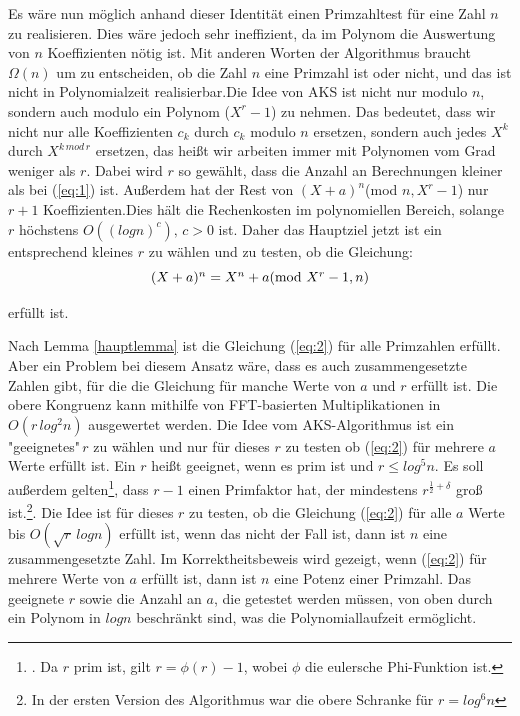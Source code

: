 \documentclass[12pt,oneside]{article}
\theoremstyle{remark}
\theoremstyle{definition}
\begin{document}
\begin{flushleft}
Es wäre nun möglich anhand dieser Identität einen Primzahltest für eine Zahl $n$ zu realisieren. Dies wäre jedoch sehr ineffizient, da im Polynom die Auswertung von $n$ Koeffizienten nötig ist. Mit anderen Worten der Algorithmus braucht $\Omega(n)$ um zu entscheiden, ob die Zahl $n$ eine Primzahl ist oder nicht, und das ist nicht in Polynomialzeit realisierbar.\newline\newline Die Idee von AKS ist nicht nur modulo $n$, sondern auch modulo ein Polynom ($X^r -1$) zu nehmen. Das bedeutet, dass wir nicht nur alle Koeffizienten $c_{k}$ durch $c_{k}$ modulo $n$ ersetzen, sondern auch jedes $X^k$ durch $X^{k \, mod \, r}$ ersetzen, das heißt wir arbeiten immer mit Polynomen vom Grad weniger als $r$. Dabei wird $r$ so gewählt, dass die Anzahl an Berechnungen kleiner als bei (\ref{eq:1}) ist. Außerdem hat der Rest von $(X + a)^n$(mod $ n, X^r - 1$) nur $ r + 1$ Koeffizienten.\newline Dies hält die Rechenkosten im polynomiellen Bereich, solange $r$ höchstens $O ((log n)^c), \, c > 0$ ist. Daher das Hauptziel jetzt ist ein entsprechend kleines $r$ zu wählen und zu testen, ob die Gleichung:\newline\newline
\begin{equation}\label{eq:2}
    \centerline{$(X + a)^n = X^n + a $(mod $X^r - 1, n$)}
\end{equation}

erfüllt ist.\newline

Nach Lemma \ref{hauptlemma} ist die Gleichung (\ref{eq:2}) für alle Primzahlen erfüllt. Aber ein Problem bei diesem Ansatz wäre, dass es auch zusammengesetzte Zahlen gibt, für die die Gleichung für manche Werte von $a$ und $r$ erfüllt ist. Die obere Kongruenz kann mithilfe von FFT-basierten Multiplikationen in $O(r \, log^2 n)$ ausgewertet werden\cite{D73}. Die Idee vom AKS-Algorithmus ist ein "geeignetes"$\, r$ zu wählen und nur für dieses $r$ zu testen ob (\ref{eq:2}) für mehrere $a$ Werte erfüllt ist. Ein $r$ heißt geeignet, wenn es prim ist und $r \leq log^5 n$. Es soll außerdem gelten\footnote{. Da $r$ prim ist, gilt $r = \phi(r) - 1 $, wobei $\phi$ die eulersche Phi-Funktion ist.}, dass $r - 1$ einen Primfaktor hat, der mindestens $r^{\frac{1}{2} + \delta}$ groß ist.\footnote{In der ersten Version des Algorithmus war die obere Schranke für $r = log^6 n$}. Die Idee ist für dieses $r$ zu testen, ob die Gleichung (\ref{eq:2}) für alle $a$ Werte bis $O(\sqrt{r}\, logn)$ erfüllt ist, wenn das nicht der Fall ist, dann ist $n$ eine zusammengesetzte Zahl. Im Korrektheitsbeweis wird gezeigt, wenn (\ref{eq:2}) für mehrere Werte von $a$ erfüllt ist, dann ist $n$ eine Potenz einer Primzahl. Das geeignete $r$ sowie die Anzahl an $a$, die getestet werden müssen, von oben durch ein Polynom in $log n$ beschränkt sind, was die Polynomiallaufzeit ermöglicht.

\newpage

\end{flushleft}
\end{document}
